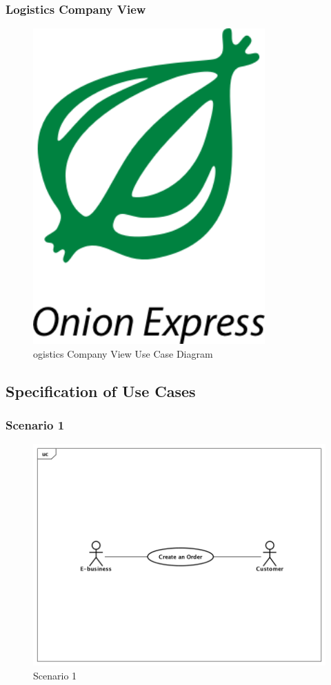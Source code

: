 \documentclass[12pt]{scrreprt}
\begin{document}
\subsubsection{Logistics Company View}
\begin{figure}[htbp]
  \centering\includegraphics[width=3.5in]{DocumentRes/OnionExpress.png}
  \caption{ogistics Company View Use Case Diagram}
\end{figure}

\subsection{Specification of Use Cases}
\subsubsection{Scenario 1}
\begin{figure}[htbp]
  \centering\includegraphics[width=6in]{DocumentRes/Scenario1.png}
  \caption{Scenario 1}
\end{figure}
\end{document}
